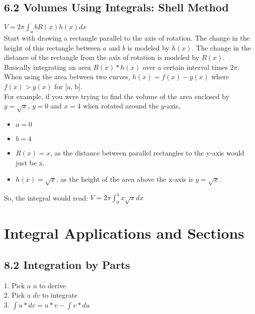 \documentclass{article}
\begin{document}
        \subsection*{6.2 Volumes Using Integrals: Shell Method}
            $V= 2 \pi \int_{a}{b} R(x)h(x)dx$ \\
            Start with drawing a rectangle parallel to the axis of rotation. The change in the height of this rectangle between $a$ and $b$ is modeled by $h(x)$. The change in the distance of the rectangle from the axis of rotation is modeled by $R(x)$. \\
            Basically integrating an area $R(x) * h(x)$ over a certain interval times $2 \pi$. \\
            When using the area between two curves, $h(x) = f(x) - g(x)$ where $f(x) > g(x)$ for [a, b]. \\
            For example, if you were trying to find the volume of the area enclosed by $y=\sqrt{x}$, $y=0$ and $x=4$ when rotated around the $y$-axis, \\
            \begin{itemize}
                \item $a = 0$ \\
                \item $b = 4$ \\
                \item $R(x) = x$, as the distance between parallel rectangles to the y-axis would just be x. \\
                \item $h(x) = \sqrt{x}$, as the height of the area above the x-axis is $y=\sqrt{x}$. \\
            \end{itemize}
            So, the integral would read: $V = 2 \pi \int_{0}^{4} x \sqrt{x} dx$ \\

        \color{Black}
    \section{Integral Applications and Sections}
        \color{Cyan} 
        \subsection*{8.2 Integration by Parts}
            1. Pick a $u$ to derive \\
            2. Pick a $dv$ to integrate \\
            3. $\int u * dv = u * v - \int v * du$ \\
        \color{Cerulean}
\end{document}

